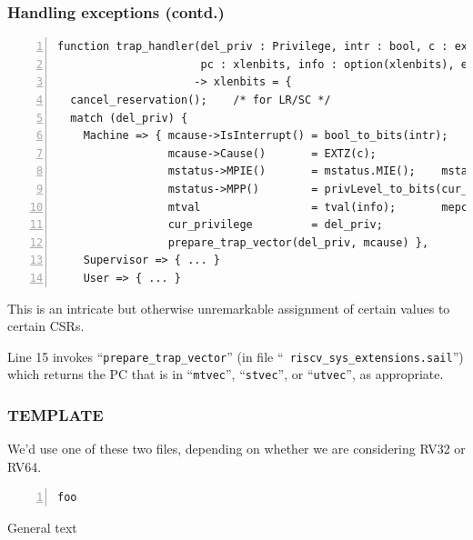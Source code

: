 \documentclass[aspectratio=169]{beamer}
\newcommand{\slidefont}{\scriptsize}
\newcommand{\cf}{\scriptsize\tt}
\begin{document}
\begin{frame}[fragile]
  \frametitle{Handling exceptions (contd.)}

  \slidefont

  \begin{Verbatim}[frame=single, numbers=left, label = File riscv\_sys\_control.sail]
function trap_handler(del_priv : Privilege, intr : bool, c : exc_code,
                      pc : xlenbits, info : option(xlenbits), ext : option(ext_exception))
                     -> xlenbits = {
  cancel_reservation();    /* for LR/SC */
  match (del_priv) {
    Machine => { mcause->IsInterrupt() = bool_to_bits(intr);
                 mcause->Cause()       = EXTZ(c);
                 mstatus->MPIE()       = mstatus.MIE();    mstatus->MIE() = 0b0;
                 mstatus->MPP()        = privLevel_to_bits(cur_privilege);
                 mtval                 = tval(info);       mepc           = pc;
                 cur_privilege         = del_priv;
                 prepare_trap_vector(del_priv, mcause) },
    Supervisor => { ... }
    User => { ... }
\end{Verbatim}

  \begin{minipage}{\textwidth}
    This is an intricate but otherwise unremarkable assignment of certain values to certain CSRs.

    \vspace{1ex}

    Line 15 invokes ``{\cf prepare\_trap\_vector}'' (in file ``{\cf
      riscv\_sys\_extensions.sail}'') which returns the PC that is in
    ``{\cf mtvec}'', ``{\cf stvec}'', or ``{\cf utvec}'', as appropriate.

  \end{minipage}

\end{frame}



\begin{frame}[fragile]
  \frametitle{TEMPLATE}

  \slidefont

  We'd use one of these two files, depending on whether we are considering RV32 or RV64.

  \begin{Verbatim}[frame=single, numbers=left, label = File filename.sail]
    foo
  \end{Verbatim}

  \begin{minipage}{\textwidth}
    General text
  \end{minipage}

\end{frame}
\end{document}
